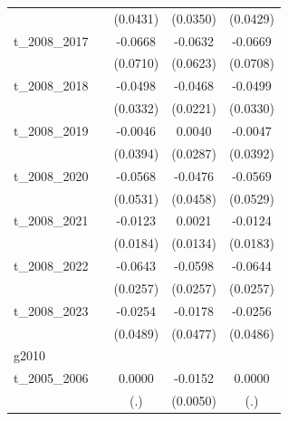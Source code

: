 \begin{table}[htbp]
\begin{tabular}{l*{4}{c}}
            &                     &    (0.0431)         &    (0.0350)         &    (0.0429)         \\
[1em]
t\_2008\_2017 &                     &     -0.0668         &     -0.0632         &     -0.0669         \\
            &                     &    (0.0710)         &    (0.0623)         &    (0.0708)         \\
[1em]
t\_2008\_2018 &                     &     -0.0498         &     -0.0468\sym{**} &     -0.0499         \\
            &                     &    (0.0332)         &    (0.0221)         &    (0.0330)         \\
[1em]
t\_2008\_2019 &                     &     -0.0046         &      0.0040         &     -0.0047         \\
            &                     &    (0.0394)         &    (0.0287)         &    (0.0392)         \\
[1em]
t\_2008\_2020 &                     &     -0.0568         &     -0.0476         &     -0.0569         \\
            &                     &    (0.0531)         &    (0.0458)         &    (0.0529)         \\
[1em]
t\_2008\_2021 &                     &     -0.0123         &      0.0021         &     -0.0124         \\
            &                     &    (0.0184)         &    (0.0134)         &    (0.0183)         \\
[1em]
t\_2008\_2022 &                     &     -0.0643\sym{**} &     -0.0598\sym{**} &     -0.0644\sym{**} \\
            &                     &    (0.0257)         &    (0.0257)         &    (0.0257)         \\
[1em]
t\_2008\_2023 &                     &     -0.0254         &     -0.0178         &     -0.0256         \\
            &                     &    (0.0489)         &    (0.0477)         &    (0.0486)         \\
\hline
g2010       &                     &                     &                     &                     \\
t\_2005\_2006 &                     &      0.0000         &     -0.0152\sym{***}&      0.0000         \\
            &                     &         (.)         &    (0.0050)         &         (.)         \\

\end{tabular}
\end{table}
